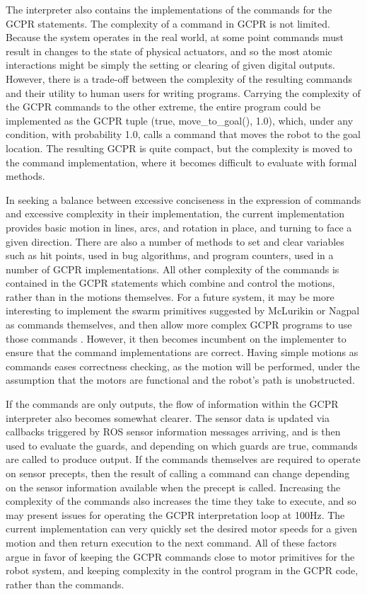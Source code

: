 The interpreter also contains the implementations of the commands for the GCPR statements. 
The complexity of a command in GCPR is not limited. 
Because the system operates in the real world, at some point commands must result in changes to the state of physical actuators, and so the most atomic interactions might be simply the setting or clearing of given digital outputs. 
However, there is a trade-off between the complexity of the resulting commands and their utility to human users for writing programs. 
Carrying the complexity of the GCPR commands to the other extreme, the entire program could be implemented as the GCPR tuple (true, move\_to\_goal(), 1.0), which, under any condition, with probability 1.0, calls a command that moves the robot to the goal location. 
The resulting GCPR is quite compact, but the complexity is moved to the command implementation, where it becomes difficult to evaluate with formal methods. 

In seeking a balance between excessive conciseness in the expression of commands and excessive complexity in their implementation, the current implementation provides basic motion in lines, arcs, and rotation in place, and turning to face a given direction. 
There are also a number of methods to set and clear variables such as hit points, used in bug algorithms, and program counters, used in a number of GCPR implementations. 
All other complexity of the commands is contained in the GCPR statements which combine and control the motions, rather than in the motions themselves. 
For a future system, it may be more interesting to implement the swarm primitives suggested by McLurikin or Nagpal as commands themselves, and then allow more complex GCPR programs to use those commands \citep{mclurkin2004stupi, nagpal2004catalog}.
However, it then becomes incumbent on the implementer to ensure that the command implementations are correct. 
Having simple motions as commands eases correctness checking, as the motion will be performed, under the assumption that the motors are functional and the robot's path is unobstructed. 

If the commands are only outputs, the flow of information within the GCPR interpreter also becomes somewhat clearer. 
The sensor data is updated via callbacks triggered by ROS sensor information messages arriving, and is then used to evaluate the guards, and depending on which guards are true, commands are called to produce output. 
If the commands themselves are required to operate on sensor precepts, then the result of calling a command can change depending on the sensor information available when the precept is called.
Increasing the complexity of the commands also increases the time they take to execute, and so may present issues for operating the GCPR interpretation loop at 100Hz. 
The current implementation can very quickly set the desired motor speeds for a given motion and then return execution to the next command.
All of these factors argue in favor of keeping the GCPR commands close to motor primitives for the robot system, and keeping complexity in the control program in the GCPR code, rather than the commands. 

